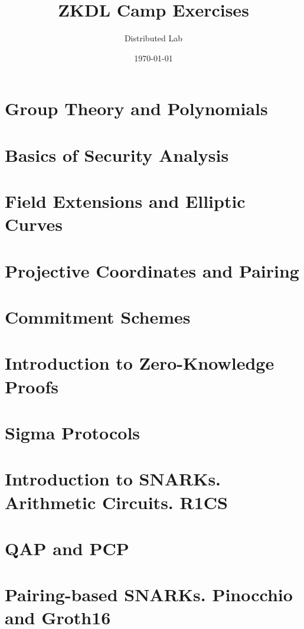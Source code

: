 \documentclass{zkdl-template}
\title{\huge\sffamily\bfseries ZKDL Camp Exercises}
\author{\Large\sffamily Distributed Lab}
\date{\sffamily \today}
\begin{document}
\pagestyle{fancy}

\maketitle

\pagebreak

\tableofcontents

\pagebreak

\section{Group Theory and Polynomials}



\section{Basics of Security Analysis}\label{section:math-crypto-2}



\section{Field Extensions and Elliptic Curves}



\section{Projective Coordinates and Pairing}



\section{Commitment Schemes}



\section{Introduction to Zero-Knowledge Proofs}



\section{Sigma Protocols}



\section{Introduction to SNARKs. Arithmetic Circuits. R1CS}



\section{QAP and PCP}



\section{Pairing-based SNARKs. Pinocchio and Groth16}


\end{document}
